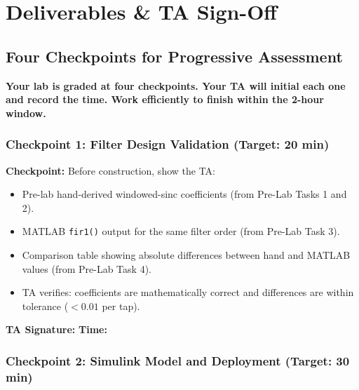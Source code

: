 \documentclass[11pt,letterpaper]{article}
\providecommand{\cpECE}[1]{\textcolor{OliveGreen}{\textbf{Checkpoint:} #1}}
\begin{document}
\clearpage

\section{Deliverables \& TA Sign-Off}

\subsection*{Four Checkpoints for Progressive Assessment}

\textbf{Your lab is graded at four checkpoints. Your TA will initial each one and record the time. Work efficiently to finish within the 2-hour window.}

\vspace{0.5cm}

\subsubsection*{Checkpoint 1: Filter Design Validation (Target: 20 min)}

\cpECE{Before construction, show the TA:}
\begin{itemize}
    \item[$\square$] Pre-lab hand-derived windowed-sinc coefficients (from Pre-Lab Tasks 1 and 2).
    \item[$\square$] MATLAB \texttt{fir1()} output for the same filter order (from Pre-Lab Task 3).
    \item[$\square$] Comparison table showing absolute differences between hand and MATLAB values (from Pre-Lab Task 4).
    \item[$\square$] TA verifies: coefficients are mathematically correct and differences are within tolerance ($< 0.01$ per tap).
\end{itemize}

\vspace{0.3cm}
\textbf{TA Signature:} \underline{\hspace{2.5cm}} \quad \textbf{Time:} \underline{\hspace{1.5cm}}

\vspace{0.5cm}

\subsubsection*{Checkpoint 2: Simulink Model and Deployment (Target: 30 min)}
\end{document}
